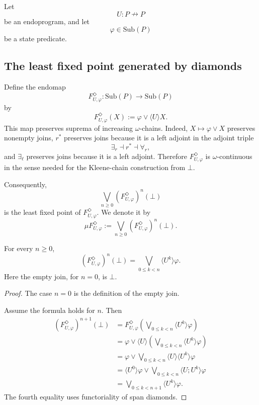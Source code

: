 Let
\[
U:P\nrightarrow P
\]
be an endoprogram, and let
\[
\varphi\in\mathrm{Sub}(P)
\]
be a state predicate.

\subsection{The least fixed point generated by diamonds}

Define the endomap
\[
F^\Diamond_{U,\varphi}:\mathrm{Sub}(P)\to\mathrm{Sub}(P)
\]
by
\[
F^\Diamond_{U,\varphi}(X)
:=
\varphi\vee\langle U\rangle X.
\]
This map preserves suprema of increasing \(\omega\)-chains. Indeed, \(X\mapsto\varphi\vee X\) preserves nonempty joins, \(r^\ast\) preserves joins because it is a left adjoint in the adjoint triple
\[
\exists_r\dashv r^\ast\dashv \forall_r,
\]
and \(\exists_\ell\) preserves joins because it is a left adjoint. Therefore \(F^\Diamond_{U,\varphi}\) is \(\omega\)-continuous in the sense needed for the Kleene-chain construction from \(\bot\).

Consequently,
\[
\bigvee_{n\ge0}(F^\Diamond_{U,\varphi})^n(\bot)
\]
is the least fixed point of \(F^\Diamond_{U,\varphi}\). We denote it by
\[
\mu F^\Diamond_{U,\varphi}
:=
\bigvee_{n\ge0}(F^\Diamond_{U,\varphi})^n(\bot).
\]

\begin{lemma}
\label{lem:diamond-approximants}
For every \(n\ge0\),
\[
(F^\Diamond_{U,\varphi})^n(\bot)
=
\bigvee_{0\le k<n}\langle U^k\rangle\varphi.
\]
Here the empty join, for \(n=0\), is \(\bot\).
\end{lemma}

\begin{proof}
The case \(n=0\) is the definition of the empty join.

Assume the formula holds for \(n\). Then
\[
\begin{aligned}
(F^\Diamond_{U,\varphi})^{n+1}(\bot)
&=
F^\Diamond_{U,\varphi}
\left(
\bigvee_{0\le k<n}\langle U^k\rangle\varphi
\right)
\\
&=
\varphi
\vee
\langle U\rangle
\left(
\bigvee_{0\le k<n}\langle U^k\rangle\varphi
\right)
\\
&=
\varphi
\vee
\bigvee_{0\le k<n}
\langle U\rangle\langle U^k\rangle\varphi
\\
&=
\langle U^0\rangle\varphi
\vee
\bigvee_{0\le k<n}
\langle U;U^k\rangle\varphi
\\
&=
\bigvee_{0\le k<n+1}
\langle U^k\rangle\varphi.
\end{aligned}
\]
The fourth equality uses functoriality of span diamonds.
\end{proof}

